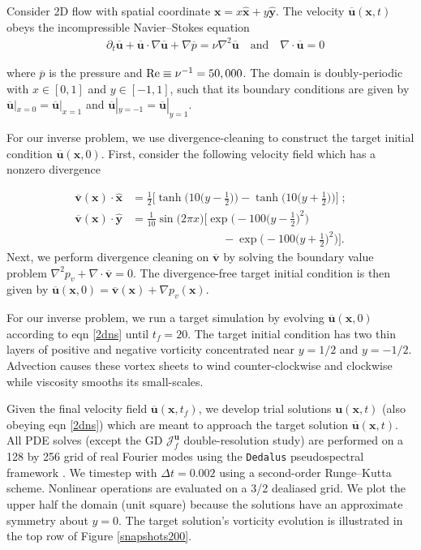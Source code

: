 \documentclass[%
 reprint,
 amsmath,amssymb,
 aps,
 pre,
]{revtex4-2}
\renewcommand{\vec}[1]{\boldsymbol{#1}}
\newcommand{\grad}{\nabla}
\newcommand{\JUf}{\mathcal{J}^{\vec{u}}_f}
\begin{document}
Consider 2D flow with spatial coordinate $\vec{x} = x\vec{\hat{x}} + y\vec{\hat{y}}$. 
The velocity $\vec{\overline{u}}(\vec{x},t)$ obeys the incompressible Navier--Stokes equation
\begin{align}
  &\partial_t \vec{\overline{u}} + \vec{\overline{u}}\cdot\grad \vec{\overline{u}} + \grad \overline{p} = \nu\grad^2\vec{\overline{u}} \quad \textrm{and} \quad \grad\cdot\vec{\overline{u}} = 0 \label{2dns}
\end{align}
  {where $\overline{p}$ is the pressure and $\rm{Re} \equiv \nu^{-1} = 50,000$. 
  The domain is doubly-periodic with $x\in[0,1]$ and $y\in[-1,1]$, such that its boundary conditions are given by $\vec{\overline{u}}|_{x = 0} = \vec{\overline{u}}|_{x = 1}$ and $\vec{\overline{u}}|_{y = -1} = \vec{\overline{u}}|_{y = 1}$. 
  
  For our inverse problem, we use divergence-cleaning to construct the target initial condition $\vec{\overline{u}}(\vec{x}, 0)$.
  First, consider the following velocity field which has a nonzero divergence}
\begin{align}
    \vec{\overline{v}}(\vec{x})\cdot\vec{\hat{x}} &= \frac{1}{2}\bigg[ \tanh\bigg(10\Big(y-\frac{1}{2}\Big)\bigg) - \tanh\bigg(10\Big(y+\frac{1}{2}\Big)\bigg) \bigg]\; \nonumber ;\\
\vec{\overline{v}}(\vec{x})\cdot\vec{\hat{y}} &= \frac{1}{10}\sin\big( 2\pi x \big)\Bigg[\exp\bigg( -100\Big(y - \frac{1}{2}\Big)^2 \bigg) \\
&\qquad\qquad\qquad\qquad - \exp\bigg( -100\Big(y + \frac{1}{2}\Big)^2 \bigg)  \Bigg].\nonumber
\end{align}
Next, we perform divergence cleaning on $\vec{\overline{v}}$ by solving the boundary value problem $\grad^2 p_v + \grad \cdot \vec{\overline{v}} =0$. 
The divergence-free target initial condition is then given by $\vec{\overline{u}}(\vec{x},0) = \vec{\overline{v}}(\vec{x}) + \grad p_v(\vec{x})$.

For our inverse problem, we run a target simulation by evolving $\vec{\overline{u}}(\vec{x}, 0)$ according to eqn \ref{2dns} until $t_f=20$.
The target initial condition has two thin layers of positive and negative vorticity concentrated near $y=1/2$ and $y=-1/2$.
Advection causes these vortex sheets to wind counter-clockwise and clockwise while viscosity smooths its small-scales.

Given the final velocity field $\vec{\overline{u}}(\vec{x}, t_f)$, we develop trial solutions $\vec{u}(\vec{x},t)$ (also obeying eqn \ref{2dns}) which are meant to approach the target solution $\vec{\overline{u}}(\vec{x},t)$.
All PDE solves (except the GD $\JUf$ double-resolution study) are performed on a 128 by 256 grid of real Fourier modes using the \texttt{Dedalus} pseudospectral framework \cite{Burns2020}. 
We timestep with $\Delta t=0.002$ using a second-order Runge--Kutta scheme. 
Nonlinear operations are evaluated on a 3/2 dealiased grid.
We plot the upper half the domain (unit square) because the solutions have an approximate symmetry about $y=0$.
The target solution's vorticity evolution is illustrated in the top row of Figure \ref{snapshots200}.
\end{document}

